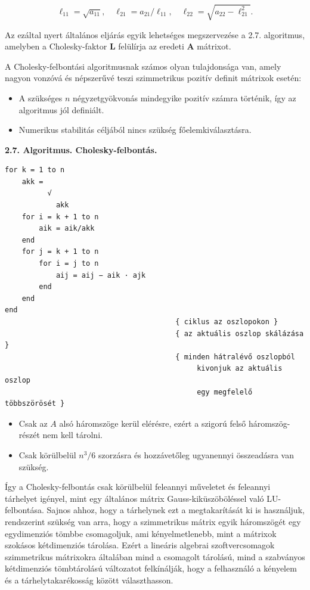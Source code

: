 \documentclass[
  magyar,
  11pt]{article}
\providecommand{\tightlist}{%
  \setlength{\itemsep}{0pt}\setlength{\parskip}{0pt}}
\providecommand{\boldsymbol}[1]{\mathbf{#1}}
\begin{document}
\[\ell_{11} = \sqrt{a_{11}}, \quad \ell_{21} = a_{21}/\ell_{11}, \quad \ell_{22} = \sqrt{a_{22} - \ell_{21}^2}.\]

Az ezáltal nyert általános eljárás egyik lehetséges megszervezése a 2.7.
algoritmus, amelyben a Cholesky-faktor \(\boldsymbol{L}\) felülírja az
eredeti \(\boldsymbol{A}\) mátrixot.

A Cholesky-felbontási algoritmusnak számos olyan tulajdonsága van, amely
nagyon vonzóvá és népszerűvé teszi szimmetrikus pozitív definit mátrixok
esetén:

\begin{itemize}
\tightlist
\item
  A szükséges \(n\) négyzetgyökvonás mindegyike pozitív számra történik,
  így az algoritmus jól definiált.
\item
  Numerikus stabilitás céljából nincs szükség főelemkiválasztásra.
\end{itemize}

\textbf{2.7. Algoritmus. Cholesky-felbontás.}

\begin{verbatim}
for k = 1 to n
    akk =
          √
            akk
    for i = k + 1 to n
        aik = aik/akk
    end
    for j = k + 1 to n
        for i = j to n
            aij = aij − aik · ajk
        end
    end
end
                                        { ciklus az oszlopokon }
                                        { az aktuális oszlop skálázása }
                                        { minden hátralévő oszlopból
                                             kivonjuk az aktuális oszlop
                                             egy megfelelő többszörösét }
\end{verbatim}

\begin{itemize}
\tightlist
\item
  Csak az \(A\) alsó háromszöge kerül elérésre, ezért a szigorú felső
  háromszög-részét nem kell tárolni.
\item
  Csak körülbelül \(n^3/6\) szorzásra és hozzávetőleg ugyanennyi
  összeadásra van szükség.
\end{itemize}

Így a Cholesky-felbontás csak körülbelül feleannyi műveletet és
feleannyi tárhelyet igényel, mint egy általános mátrix
Gauss-kiküszöböléssel való LU-felbontása. Sajnos ahhoz, hogy a
tárhelynek ezt a megtakarítását ki is használjuk, rendszerint szükség
van arra, hogy a szimmetrikus mátrix egyik háromszögét egy egydimenziós
tömbbe csomagoljuk, ami kényelmetlenebb, mint a mátrixok szokásos
kétdimenziós tárolása. Ezért a lineáris algebrai szoftvercsomagok
szimmetrikus mátrixokra általában mind a csomagolt tárolású, mind a
szabványos kétdimenziós tömbtárolású változatot felkínálják, hogy a
felhasználó a kényelem és a tárhelytakarékosság között választhasson.
\end{document}
